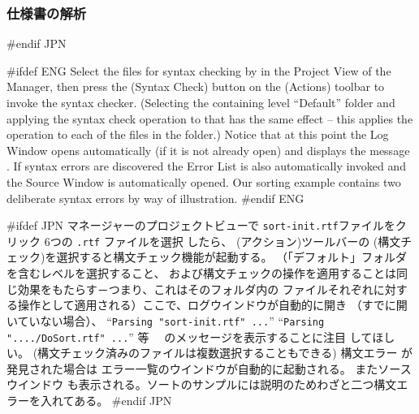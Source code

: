 \documentclass[\pformat,12pt]{article}
\newcommand{\guicmd}[1]{{\sf #1}}
\newcommand{\guicmd}[1]{{\gt #1}}
\begin{document}
\subsubsection{仕様書の解析}
#endif JPN

#ifdef ENG
Select the files for syntax checking by
 in the \guicmd{Project View}
of the \guicmd{Manager}, then press the 
(\guicmd{Syntax Check}) button on the (\guicmd{Actions})
toolbar to invoke the syntax checker. (Selecting the containing level
 ``Default'' folder and applying the syntax check operation to that
 has the same effect -- this applies the operation to each of the
 files in the folder.) Notice that at this point the
\guicmd{Log Window} opens automatically (if it is not already open)
and displays the message 
.
 If syntax
  errors are discovered the \guicmd{Error List} is
also au\-to\-matically invoked and the \guicmd{Source Window} is
automatically opened. Our sorting example contains two
deliberate syntax errors by way of illustration.
#endif ENG

#ifdef JPN
\guicmd{マネージャー}の\guicmd{プロジェクトビュー}で
{
{\tt sort-init.rtf}ファイルをクリック
}
{
6つの {\tt .rtf} ファイルを選択
}
したら、 
(\guicmd{アクション})ツールバーの  
(\guicmd{構文チェック})を選択すると構文チェック機能が起動する。
（「デフォルト」フォルダを含むレベルを選択すること、
および構文チェックの操作を適用することは同じ効果をもたらす－つまり、これはそのフォルダ内の
ファイルそれぞれに対する操作として適用される）ここで、\guicmd{ログウインドウ}が自動的に開き
（すでに開いていない場合）、
{
``{\tt Parsing "sort-init.rtf"
    ...}''
}
{
``{\tt Parsing "..../DoSort.rtf" ...}'' 等
}　のメッセージを表示することに注目
してほしい。
{
(構文チェック済みのファイルは複数選択することもできる)
}
{
} 
構文エラー が発見された場合は
\guicmd{エラー一覧}のウインドウが自動的に起動される。
また\guicmd{ソースウインドウ} も表示される。ソートのサンプルには説明のためわざと二つ構文エラーを入れてある。
#endif JPN
\end{document}
